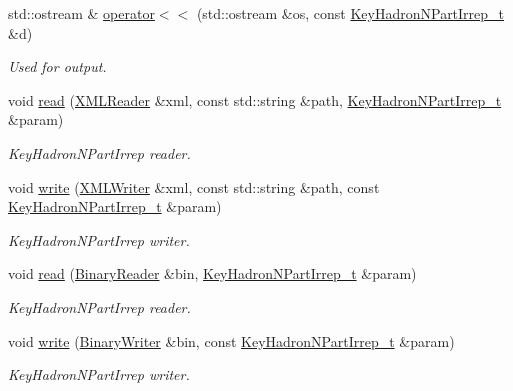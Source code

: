\begin{DoxyCompactItemize}
std\+::ostream \& \mbox{\hyperlink{namespaceHadron_a8b41635ad70840ac7fc9ebff331876e4}{operator$<$$<$}} (std\+::ostream \&os, const \mbox{\hyperlink{structHadron_1_1KeyHadronNPartIrrep__t}{Key\+Hadron\+N\+Part\+Irrep\+\_\+t}} \&d)
\begin{DoxyCompactList}\small\item\em Used for output. \end{DoxyCompactList}\item 
void \mbox{\hyperlink{namespaceHadron_a9e39323c40f07b97b83923c9bfd452b3}{read}} (\mbox{\hyperlink{classADATXML_1_1XMLReader}{X\+M\+L\+Reader}} \&xml, const std\+::string \&path, \mbox{\hyperlink{structHadron_1_1KeyHadronNPartIrrep__t}{Key\+Hadron\+N\+Part\+Irrep\+\_\+t}} \&param)
\begin{DoxyCompactList}\small\item\em Key\+Hadron\+N\+Part\+Irrep reader. \end{DoxyCompactList}\item 
void \mbox{\hyperlink{namespaceHadron_a649265e2213fc38a7907196da52300cd}{write}} (\mbox{\hyperlink{classADATXML_1_1XMLWriter}{X\+M\+L\+Writer}} \&xml, const std\+::string \&path, const \mbox{\hyperlink{structHadron_1_1KeyHadronNPartIrrep__t}{Key\+Hadron\+N\+Part\+Irrep\+\_\+t}} \&param)
\begin{DoxyCompactList}\small\item\em Key\+Hadron\+N\+Part\+Irrep writer. \end{DoxyCompactList}\item 
void \mbox{\hyperlink{namespaceHadron_a39c4036ab90e294b04374fa9d1879ec4}{read}} (\mbox{\hyperlink{classADATIO_1_1BinaryReader}{Binary\+Reader}} \&bin, \mbox{\hyperlink{structHadron_1_1KeyHadronNPartIrrep__t}{Key\+Hadron\+N\+Part\+Irrep\+\_\+t}} \&param)
\begin{DoxyCompactList}\small\item\em Key\+Hadron\+N\+Part\+Irrep reader. \end{DoxyCompactList}\item 
void \mbox{\hyperlink{namespaceHadron_a38af8457b328042ae00ad011656edc71}{write}} (\mbox{\hyperlink{classADATIO_1_1BinaryWriter}{Binary\+Writer}} \&bin, const \mbox{\hyperlink{structHadron_1_1KeyHadronNPartIrrep__t}{Key\+Hadron\+N\+Part\+Irrep\+\_\+t}} \&param)
\begin{DoxyCompactList}\small\item\em Key\+Hadron\+N\+Part\+Irrep writer. \end{DoxyCompactList}\item 

\end{DoxyCompactItemize}
